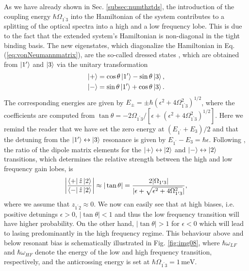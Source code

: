 \documentclass[10pt,letterpaper]{article}%
\begin{document}
\begin{appendices}
As we have already shown in Sec. \ref{subsec:numthztds}, the introduction of
the coupling energy $\hbar\Omega_{1^{\prime}3}$ into the Hamiltonian of the
system contributes to a splitting of the optical spectra into a high and a low
frequency lobe. This is due to the fact that the extended system's Hamiltonian
is non-diagonal in the tight binding basis. The new eigenstates, which
diagonalize the Hamiltonian in Eq. (\ref{eq:vonNeumannmatrix}), are the
so-called dressed states \cite{callebaut2005importance,dupont2010simplified},
which are obtained from $\Ket{1'}$ and $\Ket{3}$ via the unitary
transformation
\begin{align}
\Ket{+} &  =\cos\theta\Ket{1'}-\sin\theta\Ket{3}%
,\nonumber\label{eq:dressedstates}\\
\Ket{-} &  =\sin\theta\Ket{1'}+\cos\theta\Ket{3}.
\end{align}
The corresponding energies are given by $E_{\pm}=\pm\hbar(\epsilon
^{2}+4\Omega_{1^{\prime}3}^{2})^{1/2}$, where the coefficients are computed from
$\tan\theta=-2\Omega_{1^{\prime}3}/[\epsilon+\left(  \epsilon^{2}%
+4\Omega_{1^{\prime}3}^{2}\right)  ^{1/2}].$ Here we remind the reader that we
have set the zero energy at $(E_{1^{\prime}}+E_{3})/2$ and that the detuning
from the $\Ket{1^{\prime}}\leftrightarrow\Ket{3}$ resonance is given by
$E_{1^{\prime}}-E_{3}=\hbar\epsilon$. Following \cite{dupont2010simplified},
the ratio of the dipole matrix elements for the $\Ket{+}\leftrightarrow\Ket
{2}$ and $\Ket{-}\leftrightarrow\Ket{2}$ transitions, which determines the
relative strength between the high and low frequency gain lobes, is
\[
\left|  \frac{\Bra{+}\hat{z}\Ket{2}}{\Bra{-}\hat{z}\Ket{2}}\right|
\approx|\tan\theta|=\frac{2|\Omega_{1^{\prime}3}|}{|\epsilon+\sqrt
{\epsilon^{2}+4\Omega_{1^{\prime}3}^{2}}|},
\]
where we assume that $z_{1^{\prime}2}\approx0$. We now can easily see that at
high biases, i.e. positive detunings $\epsilon>0$, $|\tan\theta|<1$ and thus
the low frequency transition will have higher probability. On the other hand,
$|\tan\theta|>1$ for $\epsilon<0$ which will lead to lasing predominantly in
the high frequency regime. This behaviour above and below resonant bias is
schematically illustrated in Fig. \ref{fig:img08}, where $\hbar\omega_{LF}$
and $\hbar\omega_{HF}$ denote the energy of the low and high frequency
transition, respectively, and the anticrossing energy is set at $\hbar
\Omega_{1^{\prime}3}=1{\,}\mathrm{meV}$. \label{sec:biasdependence}
\begin{figure}[h]
\begin{center}

\end{center}
\end{figure}
\end{appendices}
\end{document}
